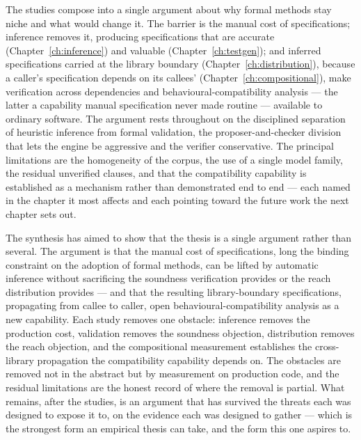 The studies compose into a single argument about why formal methods stay niche and
what would change it. The barrier is the manual cost of specifications; inference
removes it, producing specifications that are accurate
(Chapter~\ref{ch:inference}) and valuable (Chapter~\ref{ch:testgen}); and inferred
specifications carried at the library boundary (Chapter~\ref{ch:distribution}),
because a caller's specification depends on its callees' (Chapter~\ref{ch:compositional}),
make verification across dependencies and behavioural-compatibility analysis ---
the latter a capability manual specification never made routine --- available to
ordinary software. The argument rests throughout on the disciplined separation of
heuristic inference from formal validation, the proposer-and-checker division that
lets the engine be aggressive and the verifier conservative. The principal
limitations are the homogeneity of the corpus, the use of a single model family,
the residual unverified clauses, and that the compatibility capability is
established as a mechanism rather than demonstrated end to end --- each named in the
chapter it most affects and each pointing toward the future work the next chapter
sets out.

The synthesis has aimed to show that the thesis is a single argument rather than
several. The argument is that the manual cost of specifications, long the binding
constraint on the adoption of formal methods, can be lifted by automatic inference
without sacrificing the soundness verification provides or the reach distribution
provides --- and that the resulting library-boundary specifications, propagating
from callee to caller, open behavioural-compatibility analysis as a new capability.
Each study removes one obstacle: inference removes the production cost, validation
removes the soundness objection, distribution removes the reach objection, and the
compositional measurement establishes the cross-library propagation the
compatibility capability depends on. The obstacles are removed not in the abstract
but by measurement on production code, and the residual limitations are the honest
record of where the removal is partial. What remains, after the studies, is an
argument that has survived the threats each was designed to expose it to, on the
evidence each was designed to gather --- which is the strongest form an empirical
thesis can take, and the form this one aspires to.
